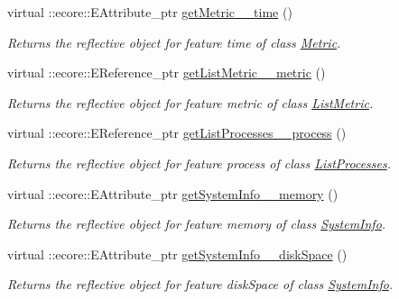 \begin{DoxyCompactItemize}
virtual ::ecore::EAttribute\_\-ptr \hyperlink{classIMS__Data_1_1IMS__DataPackage_a705f4d36b07f55821f1150994eb15ba3}{getMetric\_\-\_\-time} ()
\begin{DoxyCompactList}\small\item\em Returns the reflective object for feature time of class \hyperlink{classIMS__Data_1_1Metric}{Metric}. \item\end{DoxyCompactList}\item 
virtual ::ecore::EReference\_\-ptr \hyperlink{classIMS__Data_1_1IMS__DataPackage_ae067fc55e75cb20023d73cdb08d7a24e}{getListMetric\_\-\_\-metric} ()
\begin{DoxyCompactList}\small\item\em Returns the reflective object for feature metric of class \hyperlink{classIMS__Data_1_1ListMetric}{ListMetric}. \item\end{DoxyCompactList}\item 
virtual ::ecore::EReference\_\-ptr \hyperlink{classIMS__Data_1_1IMS__DataPackage_a5151a8d4e7f293e06ff8a9a6775e8787}{getListProcesses\_\-\_\-process} ()
\begin{DoxyCompactList}\small\item\em Returns the reflective object for feature process of class \hyperlink{classIMS__Data_1_1ListProcesses}{ListProcesses}. \item\end{DoxyCompactList}\item 
virtual ::ecore::EAttribute\_\-ptr \hyperlink{classIMS__Data_1_1IMS__DataPackage_a445058716acb1698bee2aee2dee1ffa9}{getSystemInfo\_\-\_\-memory} ()
\begin{DoxyCompactList}\small\item\em Returns the reflective object for feature memory of class \hyperlink{classIMS__Data_1_1SystemInfo}{SystemInfo}. \item\end{DoxyCompactList}\item 
virtual ::ecore::EAttribute\_\-ptr \hyperlink{classIMS__Data_1_1IMS__DataPackage_a09af02d1cf281c3573c148269394fb64}{getSystemInfo\_\-\_\-diskSpace} ()
\begin{DoxyCompactList}\small\item\em Returns the reflective object for feature diskSpace of class \hyperlink{classIMS__Data_1_1SystemInfo}{SystemInfo}. \item\end{DoxyCompactList}\item 

\end{DoxyCompactItemize}
